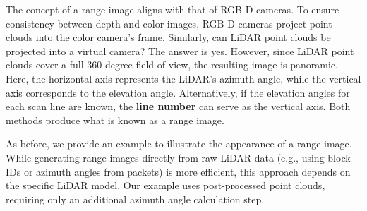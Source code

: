 The concept of a range image aligns with that of RGB-D cameras. To ensure consistency between depth and color images, RGB-D cameras project point clouds into the color camera's frame. Similarly, can LiDAR point clouds be projected into a virtual camera? The answer is yes. However, since LiDAR point clouds cover a full 360-degree field of view, the resulting image is panoramic. Here, the horizontal axis represents the LiDAR's azimuth angle, while the vertical axis corresponds to the elevation angle. Alternatively, if the elevation angles for each scan line are known, the \textbf{line number} can serve as the vertical axis. Both methods produce what is known as a range image.  

As before, we provide an example to illustrate the appearance of a range image. While generating range images directly from raw LiDAR data (e.g., using block IDs or azimuth angles from packets) is more efficient, this approach depends on the specific LiDAR model. Our example uses post-processed point clouds, requiring only an additional azimuth angle calculation step.  

